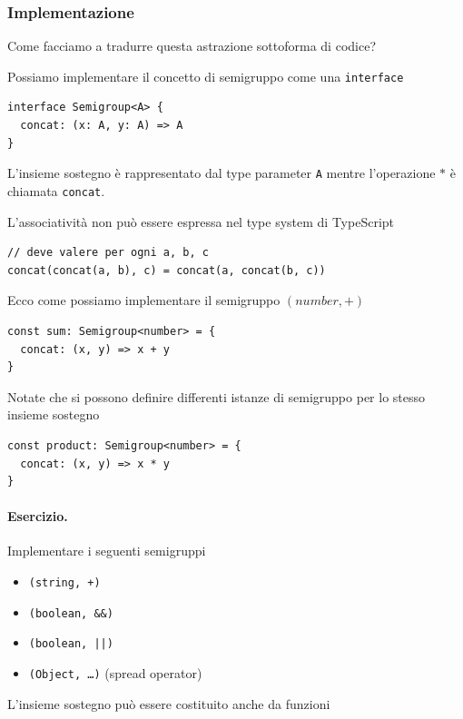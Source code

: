 \documentclass[12pt]{article}
\begin{document}
\subsubsection{Implementazione}

Come facciamo a tradurre questa astrazione sottoforma di codice?

Possiamo implementare il concetto di semigruppo come una \texttt{interface}

\begin{verbatim}
interface Semigroup<A> {
  concat: (x: A, y: A) => A
}
\end{verbatim}

L'insieme sostegno è rappresentato dal type parameter \texttt{A} mentre l'operazione $*$ è chiamata \texttt{concat}.

L'associatività non può essere espressa nel type system di TypeScript

\begin{verbatim}
// deve valere per ogni a, b, c
concat(concat(a, b), c) = concat(a, concat(b, c))
\end{verbatim}

Ecco come possiamo implementare il semigruppo $(number, +)$

\begin{verbatim}
const sum: Semigroup<number> = {
  concat: (x, y) => x + y
}
\end{verbatim}

Notate che si possono definire differenti istanze di semigruppo per lo stesso insieme sostegno

\begin{verbatim}
const product: Semigroup<number> = {
  concat: (x, y) => x * y
}
\end{verbatim}

\paragraph{Esercizio.} Implementare i seguenti semigruppi
\begin{itemize}
  \item \texttt{(string, +)}
  \item \texttt{(boolean, \&\&)}
  \item \texttt{(boolean, ||)}
  \item \texttt{(Object, \ldots)} (spread operator)
\end{itemize}

L'insieme sostegno può essere costituito anche da funzioni
\end{document}
